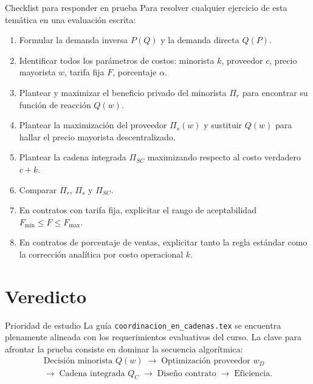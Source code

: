 \documentclass[11pt,a4paper]{article}
\begin{document}
\begin{alerta}{Checklist para responder en prueba}
Para resolver cualquier ejercicio de esta temática en una evaluación escrita:
\begin{enumerate}[itemsep=2pt]
    \item Formular la demanda inversa \(P(Q)\) y la demanda directa \(Q(P)\).
    \item Identificar todos los parámetros de costos: minorista \(k\), proveedor \(c\), precio mayorista \(w\), tarifa fija \(F\), porcentaje \(\alpha\).
    \item Plantear y maximizar el beneficio privado del minorista \(\Pi_r\) para encontrar su función de reacción \(Q(w)\).
    \item Plantear la maximización del proveedor \(\Pi_s(w)\) y sustituir \(Q(w)\) para hallar el precio mayorista descentralizado.
    \item Plantear la cadena integrada \(\Pi_{SC}\) maximizando respecto al costo verdadero \(c + k\).
    \item Comparar \(\Pi_r\), \(\Pi_s\) y \(\Pi_{SC}\).
    \item En contratos con tarifa fija, explicitar el rango de aceptabilidad \(F_{\min} \le F \le F_{\max}\).
    \item En contratos de porcentaje de ventas, explicitar tanto la regla estándar como la corrección analítica por costo operacional \(k\).
\end{enumerate}
\end{alerta}

\section{Veredicto}

\begin{analisis}{Prioridad de estudio}
La guía \texttt{coordinacion\_en\_cadenas.tex} se encuentra plenamente alineada con los requerimientos evaluativos del curso. La clave para afrontar la prueba consiste en dominar la secuencia algorítmica:
\[
\begin{array}{c}
\text{Decisión minorista } Q(w) \;\longrightarrow\; \text{Optimización proveedor } w_D \\
\longrightarrow\; \text{Cadena integrada } Q_C \;\longrightarrow\; \text{Diseño contrato} \;\longrightarrow\; \text{Eficiencia}.
\end{array}
\]
\end{analisis}
\end{document}
